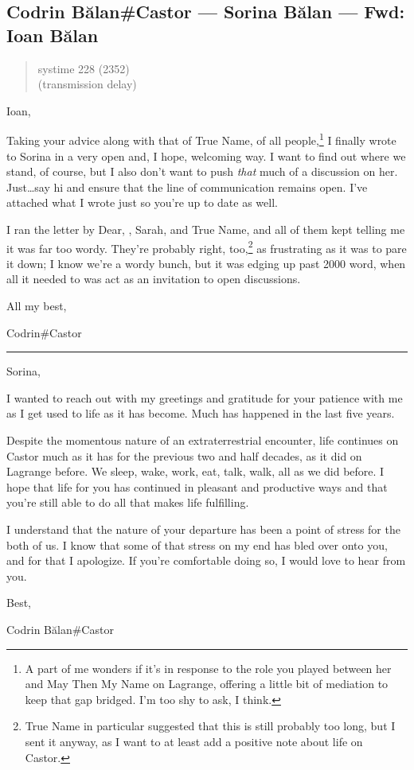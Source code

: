 \hypertarget{codrin-bux103lancastor-sorina-bux103lan-fwd-ioan-bux103lan}{%
\subsection{Codrin Bălan\#Castor — Sorina Bălan — Fwd: Ioan Bălan}\label{codrin-bux103lancastor-sorina-bux103lan-fwd-ioan-bux103lan}}

\begin{quote}
systime 228 (2352)\\
(transmission delay)
\end{quote}

Ioan,

Taking your advice along with that of True Name, of all people,\footnote{A part of me wonders if it's in response to the role you played between her and May Then My Name on Lagrange, offering a little bit of mediation to keep that gap bridged. I'm too shy to ask, I think.} I finally wrote to Sorina in a very open and, I hope, welcoming way. I want to find out where we stand, of course, but I also don't want to push \emph{that} much of a discussion on her. Just\ldots say hi and ensure that the line of communication remains open. I've attached what I wrote just so you're up to date as well.

I ran the letter by Dear, \Partner , Sarah, and True Name, and all of them kept telling me it was far too wordy. They're probably right, too,\footnote{True Name in particular suggested that this is still probably too long, but I sent it anyway, as I want to at least add a positive note about life on Castor.} as frustrating as it was to pare it down; I know we're a wordy bunch, but it was edging up past 2000 word, when all it needed to was act as an invitation to open discussions.

All my best,

Codrin\#Castor

\begin{center}\rule{0.5\linewidth}{0.5pt}\end{center}

Sorina,

I wanted to reach out with my greetings and gratitude for your patience with me as I get used to life as it has become. Much has happened in the last five years.

Despite the momentous nature of an extraterrestrial encounter, life continues on Castor much as it has for the previous two and half decades, as it did on Lagrange before. We sleep, wake, work, eat, talk, walk, all as we did before. I hope that life for you has continued in pleasant and productive ways and that you're still able to do all that makes life fulfilling.

I understand that the nature of your departure has been a point of stress for the both of us. I know that some of that stress on my end has bled over onto you, and for that I apologize. If you're comfortable doing so, I would love to hear from you.

Best,

Codrin Bălan\#Castor
